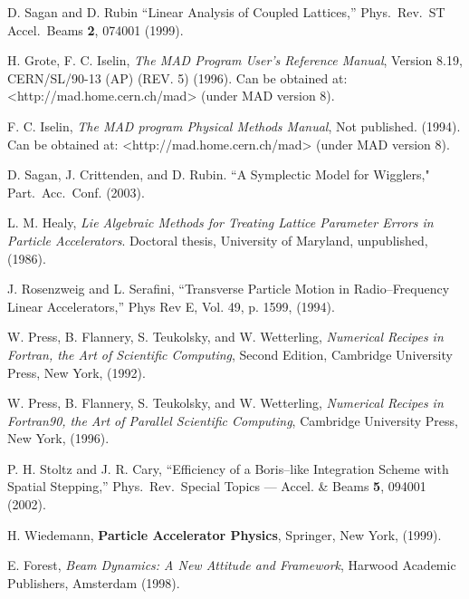 \begin{thebibliography}{99}

D. Sagan and D. Rubin ``Linear Analysis of Coupled Lattices,''
Phys.\ Rev.\ ST Accel.\ Beams {\bf 2}, 074001 (1999).

H. Grote, F. C. Iselin, {\it The MAD Program User's Reference Manual},
Version 8.19, CERN/SL/90-13 (AP) (REV. 5) (1996). Can be obtained at:
<http://mad.home.cern.ch/mad> (under MAD version 8).

F. C. Iselin, {\it The MAD program Physical Methods Manual}, Not
published. (1994).  Can be obtained at: <http://mad.home.cern.ch/mad>
(under MAD version 8).

D. Sagan, J. Crittenden, and D. Rubin.
``A Symplectic Model for Wigglers," Part.\ Acc.\ Conf. (2003).

L. M. Healy, {\it Lie Algebraic Methods for Treating Lattice Parameter
Errors in Particle Accelerators}. Doctoral thesis, University of
Maryland, unpublished, (1986).

J. Rosenzweig and L. Serafini, ``Transverse Particle Motion in
Radio--Frequency Linear Accelerators,'' Phys Rev E, Vol. 49, p. 1599,
(1994).

W. Press, B. Flannery, S. Teukolsky, and W. Wetterling, {\em Numerical
Recipes in Fortran, the Art of Scientific Computing}, Second Edition,
Cambridge University Press, New York, (1992).

W. Press, B. Flannery, S. Teukolsky, and W. Wetterling, {\em Numerical
Recipes in Fortran90, the Art of Parallel Scientific Computing}, 
Cambridge University Press, New York, (1996).


P. H. Stoltz and J. R. Cary, ``Efficiency of a Boris--like Integration
Scheme with Spatial Stepping,'' Phys.\ Rev.\ Special Topics ---
Accel. \& Beams {\bf 5}, 094001 (2002).

H. Wiedemann, {\bf Particle Accelerator Physics}, Springer, New York, (1999). 

E. Forest, {\em Beam Dynamics: A New Attitude and Framework},
Harwood Academic Publishers, Amsterdam (1998).

\end{thebibliography}
